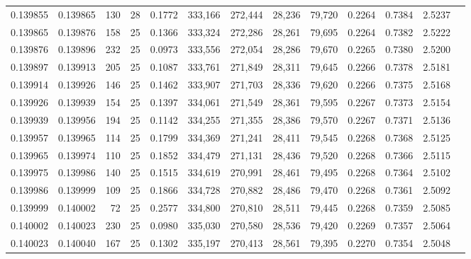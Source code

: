 \begin{tabular}{rrrrrrrrrrrrr}
0.139855 & 0.139865 &   130 &  28 &                                     0.1772 & 333,166 & 272,444 &  28,236 &  79,720 & 0.2264 & 0.7384 & 2.5237 \\
0.139865 & 0.139876 &   158 &  25 &                                     0.1366 & 333,324 & 272,286 &  28,261 &  79,695 & 0.2264 & 0.7382 & 2.5222 \\
0.139876 & 0.139896 &   232 &  25 &                                     0.0973 & 333,556 & 272,054 &  28,286 &  79,670 & 0.2265 & 0.7380 & 2.5200 \\
0.139897 & 0.139913 &   205 &  25 &                                     0.1087 & 333,761 & 271,849 &  28,311 &  79,645 & 0.2266 & 0.7378 & 2.5181 \\
0.139914 & 0.139926 &   146 &  25 &                                     0.1462 & 333,907 & 271,703 &  28,336 &  79,620 & 0.2266 & 0.7375 & 2.5168 \\
0.139926 & 0.139939 &   154 &  25 &                                     0.1397 & 334,061 & 271,549 &  28,361 &  79,595 & 0.2267 & 0.7373 & 2.5154 \\
0.139939 & 0.139956 &   194 &  25 &                                     0.1142 & 334,255 & 271,355 &  28,386 &  79,570 & 0.2267 & 0.7371 & 2.5136 \\
0.139957 & 0.139965 &   114 &  25 &                                     0.1799 & 334,369 & 271,241 &  28,411 &  79,545 & 0.2268 & 0.7368 & 2.5125 \\
0.139965 & 0.139974 &   110 &  25 &                                     0.1852 & 334,479 & 271,131 &  28,436 &  79,520 & 0.2268 & 0.7366 & 2.5115 \\
0.139975 & 0.139986 &   140 &  25 &                                     0.1515 & 334,619 & 270,991 &  28,461 &  79,495 & 0.2268 & 0.7364 & 2.5102 \\
0.139986 & 0.139999 &   109 &  25 &                                     0.1866 & 334,728 & 270,882 &  28,486 &  79,470 & 0.2268 & 0.7361 & 2.5092 \\
0.139999 & 0.140002 &    72 &  25 &                                     0.2577 & 334,800 & 270,810 &  28,511 &  79,445 & 0.2268 & 0.7359 & 2.5085 \\
0.140002 & 0.140023 &   230 &  25 &                                     0.0980 & 335,030 & 270,580 &  28,536 &  79,420 & 0.2269 & 0.7357 & 2.5064 \\
0.140023 & 0.140040 &   167 &  25 &                                     0.1302 & 335,197 & 270,413 &  28,561 &  79,395 & 0.2270 & 0.7354 & 2.5048 \\

\end{tabular}
